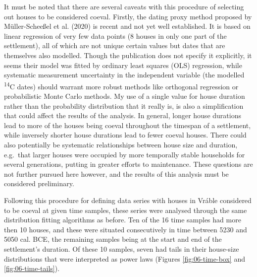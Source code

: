 \documentclass[
  12pt,
]{book}
\begin{document}
It must be noted that there are several caveats with this procedure of selecting out houses to be considered coeval. Firstly, the dating proxy method proposed by Müller-Scheeßel et al. (2020) is recent and not yet well established. It is based on linear regression of very few data points (8 houses in only one part of the settlement), all of which are not unique certain values but dates that are themselves also modelled. Though the publication does not specify it explicitly, it seems their model was fitted by ordinary least squares (OLS) regression, while systematic measurement uncertainty in the independent variable (the modelled \textsuperscript{14}C dates) should warrant more robust methods like orthogonal regression or probabilistic Monte Carlo methods. My use of a single value for house duration rather than the probability distribution that it really is, is also a simplification that could affect the results of the analysis. In general, longer house durations lead to more of the houses being coeval throughout the timespan of a settlement, while inversely shorter house durations lead to fewer coeval houses. There could also potentially be systematic relationships between house size and duration, e.g.~that larger houses were occupied by more temporally stable households for several generations, putting in greater efforts to maintenance. These questions are not further pursued here however, and the results of this analysis must be considered preliminary.

Following this procedure for defining data series with houses in Vráble considered to be coeval at given time samples, these series were analysed through the same distribution fitting algorithms as before. Ten of the 16 time samples had more then 10 houses, and these were situated consecutively in time between 5230 and 5050 cal. BCE, the remaining samples being at the start and end of the settlement's duration. Of these 10 samples, seven had tails in their house-size distributions that were interpreted as power laws (Figures \ref{fig:06-time-box} and \ref{fig:06-time-tails}).
\end{document}
